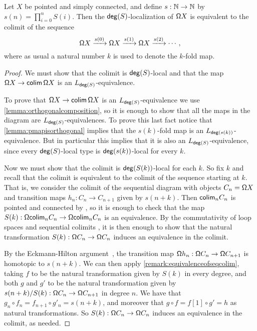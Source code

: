 \begin{thm}\label{theorem:localizationastelescope}
    Let $X$ be pointed and simply connected, and
    define $s : \mathbb{N} \to \mathbb{N}$ by $s(n) = \prod_{i=0}^n S(i)$.
    Then the $\mathsf{deg}(S)$-localization of $\mathsf{\Omega} X$ is equivalent to the colimit of the sequence
    \[\mathsf{\Omega} X \xrightarrow{s(0)}\mathsf{\Omega} X \xrightarrow{s(1)} \mathsf{\Omega} X \xrightarrow{s(2)} \cdots, \]
    where as usual a natural number $k$ is used to denote the $k$-fold map.
\end{thm}

\begin{proof}
    We must show that the colimit is $\mathsf{deg}(S)$-local and that
    the map $\mathsf{\Omega} X \to \mathsf{colim}\, \mathsf{\Omega} X$ is an $L_{\mathsf{deg}(S)}$-equivalence.
    
    To prove that $\mathsf{\Omega} X \to \mathsf{colim}\, \mathsf{\Omega} X$ is an $L_{\mathsf{deg}(S)}$-equivalence
    we use \cref{lemma:orthogonalcomposition}, so it is enough to show that all the maps in the
    diagram are $L_{\mathsf{deg}(S)}$-equivalences. To prove this last fact notice that \cref{lemma:pmapisorthogonal}
    implies that the $s(k)$-fold map is an $L_{\mathsf{deg}(s(k))}$-equivalence. But in particular this implies that it is also an
    $L_{\mathsf{deg}(S)}$-equivalence, since every $\mathsf{deg}(S)$-local type is $\mathsf{deg}(s(k))$-local for every $k$.

    Now we must show that the colimit is $\mathsf{deg}(S(k))$-local for each $k$.
    So fix $k$ and recall that
    the colimit is equivalent to the colimit of the sequence starting at $k$.
    That is, we consider the colimit of the sequential diagram with objects
    $C_n = \mathsf{\Omega} X$ and transition maps $h_n : C_n \to C_{n+1}$ given by $s(n+k)$.
    Then $\mathsf{colim}_n C_n$ is pointed and connected by \cite{DoornRijkeSojakova},
    so it is enough to check that the map $S(k) : \mathsf{\Omega} \mathsf{colim}_n C_n \to \mathsf{\Omega} \mathsf{colim}_n C_n$ is an equivalence.
    By the commutativity of loop spaces and sequential colimits \cite{DoornRijkeSojakova},
    it is then enough to show that the natural transformation $S(k) : \mathsf{\Omega} C_n \to \mathsf{\Omega} C_n$
    induces an equivalence in the colimit.

    By the Eckmann-Hilton argument~\cite[Theorem~2.1.6]{hottbook}, the transition map
    $\mathsf{\Omega} h_n : \mathsf{\Omega} C_n \to \mathsf{\Omega} C_{n+1}$ is homotopic to $s(n+k)$.
    We can then apply \cref{remark:equivalenceofseqcolim},
    taking $f$ to be the natural transformation given by
    $S(k)$ in every degree, and both $g$ and $g'$ to be the natural transformation given by
    $s(n + k)/S(k) : \mathsf{\Omega} C_n \to \mathsf{\Omega} C_{n+1}$ in degree $n$.
    We have that $g_n \circ f_n = f_{n+1} \circ g'_n = s(n + k)$, and moreover that
    $g \circ f = f[1] \circ g' = h$ as natural transformations.
    So $S(k) : \mathsf{\Omega} C_n \to \mathsf{\Omega} C_n$ induces an equivalence in the colimit,
    as needed.
\end{proof}

